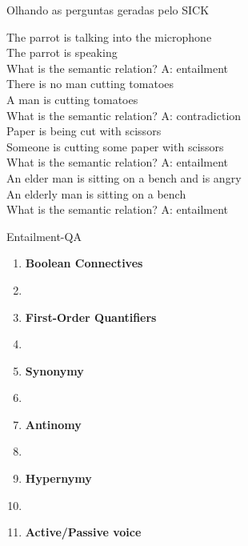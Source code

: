 \documentclass[10pt]{beamer}
\begin{document}
\begin{frame}{Olhando as perguntas geradas pelo SICK}

The parrot is talking into the microphone\\
The parrot is speaking\\
What is the semantic relation? \alert{A: entailment}\\


There is no man cutting tomatoes\\
A man is cutting tomatoes\\
What is the semantic relation? \alert{A: contradiction}\\


Paper is being cut with scissors\\
Someone is cutting some paper with scissors\\
What is the semantic relation? \alert{A: entailment}\\


An elder man is sitting on a bench and is angry\\
An elderly man is sitting on a bench\\
What is the semantic relation? \alert{A: entailment}\\
\end{frame}


\begin{frame}{Entailment-QA}

\begin{enumerate}
\item \textbf{Boolean Connectives}
\item[]
\item \textbf{First-Order Quantifiers}
\item[]
\item \textbf{Synonymy}
\item[]
\item \textbf{Antinomy}
\item[]
\item \textbf{Hypernymy}
\item[]
\item \textbf{Active/Passive voice}
\end{enumerate}
\end{frame}
\end{document}
